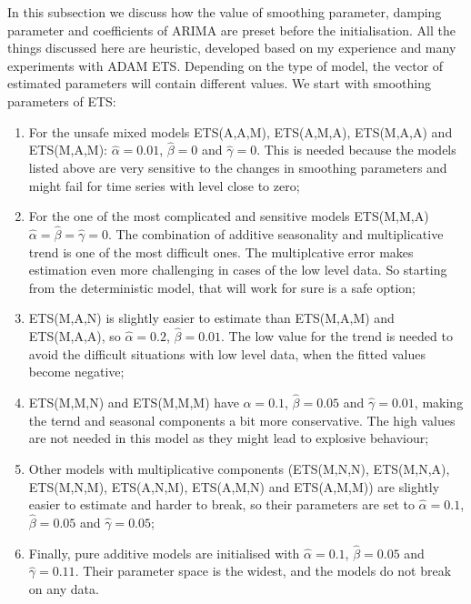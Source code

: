 \documentclass[
]{book}
\providecommand{\tightlist}{%
  \setlength{\itemsep}{0pt}\setlength{\parskip}{0pt}}
\theoremstyle{definition}
\theoremstyle{definition}
\theoremstyle{definition}
\theoremstyle{definition}
\theoremstyle{remark}
\begin{document}
In this subsection we discuss how the value of smoothing parameter, damping parameter and coefficients of ARIMA are preset before the initialisation. All the things discussed here are heuristic, developed based on my experience and many experiments with ADAM ETS. Depending on the type of model, the vector of estimated parameters will contain different values. We start with smoothing parameters of ETS:

\begin{enumerate}
\def\labelenumi{\arabic{enumi}.}
\tightlist
\item
  For the unsafe mixed models ETS(A,A,M), ETS(A,M,A), ETS(M,A,A) and ETS(M,A,M): \(\hat{\alpha}=0.01\), \(\hat{\beta}=0\) and \(\hat{\gamma}=0\). This is needed because the models listed above are very sensitive to the changes in smoothing parameters and might fail for time series with level close to zero;
\item
  For the one of the most complicated and sensitive models ETS(M,M,A) \(\hat{\alpha}=\hat{\beta}=\hat{\gamma}=0\). The combination of additive seasonality and multiplicative trend is one of the most difficult ones. The multiplcative error makes estimation even more challenging in cases of the low level data. So starting from the deterministic model, that will work for sure is a safe option;
\item
  ETS(M,A,N) is slightly easier to estimate than ETS(M,A,M) and ETS(M,A,A), so \(\hat{\alpha}=0.2\), \(\hat{\beta}=0.01\). The low value for the trend is needed to avoid the difficult situations with low level data, when the fitted values become negative;
\item
  ETS(M,M,N) and ETS(M,M,M) have \(\hat{\alpha}=0.1\), \(\hat{\beta}=0.05\) and \(\hat{\gamma}=0.01\), making the ternd and seasonal components a bit more conservative. The high values are not needed in this model as they might lead to explosive behaviour;
\item
  Other models with multiplicative components (ETS(M,N,N), ETS(M,N,A), ETS(M,N,M), ETS(A,N,M), ETS(A,M,N) and ETS(A,M,M)) are slightly easier to estimate and harder to break, so their parameters are set to \(\hat{\alpha}=0.1\), \(\hat{\beta}=0.05\) and \(\hat{\gamma}=0.05\);
\item
  Finally, pure additive models are initialised with \(\hat{\alpha}=0.1\), \(\hat{\beta}=0.05\) and \(\hat{\gamma}=0.11\). Their parameter space is the widest, and the models do not break on any data.
\end{enumerate}
\end{document}
